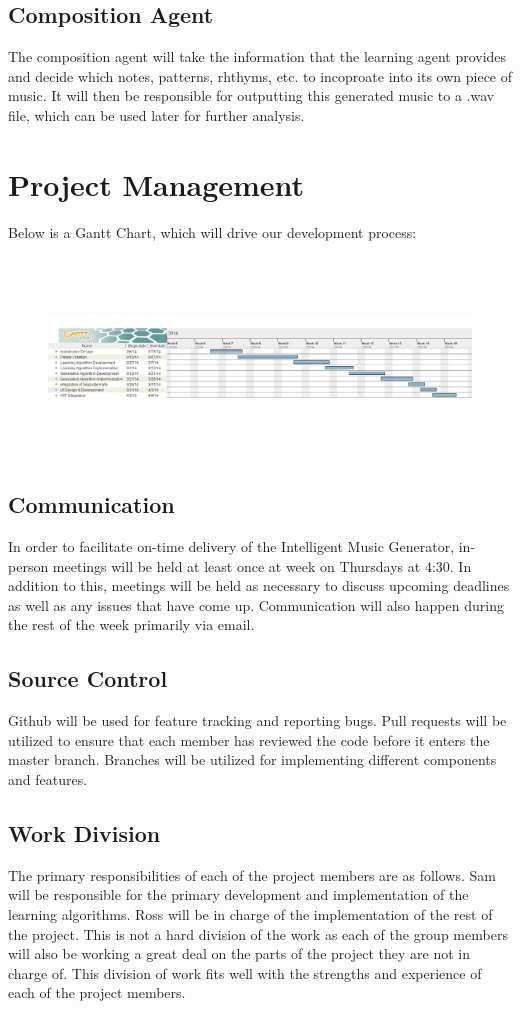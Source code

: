 \documentclass{article}
\begin{document}
\subsection{Composition Agent}
The composition agent will take the information that the learning agent provides and decide which notes, patterns, rhthyms, etc. to incoproate into its own piece of music.  It will then be responsible for outputting this generated music to a .wav file, which can be used later for further analysis.

\section{Project Management}
Below is a Gantt Chart, which will drive our development process:
\begin{figure}[ht]
\centerline {
\includegraphics[width=600, height=200]{gantt.png}
}
\end{figure}

\subsection{Communication}
In order to facilitate on-time delivery of the Intelligent Music Generator, in-person meetings will be held at least once at week on Thursdays at 4:30. In addition to this, meetings will be held as necessary to discuss upcoming deadlines as well as any issues that have come up. Communication will also happen during the rest of the week primarily via email.

\subsection{Source Control}
Github will be used for feature tracking and reporting bugs.  Pull requests will be utilized to ensure that each member has reviewed the code before it enters the master branch.  Branches will be utilized for implementing different components and features.

\subsection{Work Division}
The primary responsibilities of each of the project members are as follows. Sam will be responsible for the primary development and implementation of the learning algorithms. Ross will be in charge of the implementation of the rest of the project. This is not a hard division of the work as each of the group members will also be working a great deal on the parts of the project they are not in charge of. This division of work fits well with the strengths and experience of each of the project members.
\end{document}
